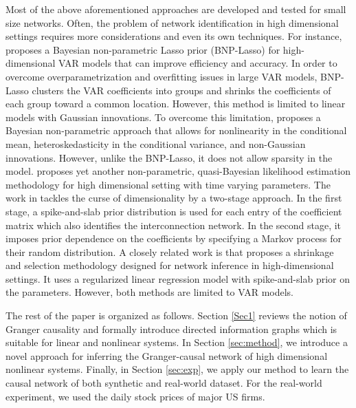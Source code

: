 Most of the above aforementioned approaches are developed and tested for small size networks. 
Often, the problem of network identification in high dimensional settings requires more considerations and even its own techniques. 
For instance, \citet{billio2019bayesian} proposes a Bayesian non-parametric Lasso prior (BNP-Lasso) for high-dimensional VAR models that can improve efficiency and accuracy. 
In order to overcome overparametrization and overfitting issues in large VAR models, BNP-Lasso clusters the VAR coefficients into groups and shrinks the coefficients of each group toward a common location.
However, this method is limited to linear models with Gaussian innovations.
To overcome this limitation, \citet{kalli2018bayesian} proposes a Bayesian non-parametric approach that allows for nonlinearity in the conditional mean, heteroskedasticity in the conditional variance, and non-Gaussian innovations. However, unlike the BNP-Lasso, it does not allow sparsity in the model.
\citet{petrova2019quasi} proposes yet another non-parametric, quasi-Bayesian likelihood estimation methodology for high dimensional setting with time varying parameters. 
The work in \citet{iacopini2019bayesian} tackles the curse of dimensionality by a two-stage approach. In the first stage, a spike-and-slab prior distribution is used for each entry of the coefficient matrix which also identifies the interconnection network.
In the second stage, it imposes prior dependence on the coefficients by specifying a Markov process for their random distribution. 
A closely related work is \citet{bernardi2019high} that proposes a shrinkage and selection methodology designed for network inference in high-dimensional settings. It uses a regularized linear regression model with spike-and-slab prior on the parameters.
However, both methods are limited to VAR models.



The rest of the paper is organized as follows. 
Section \ref{Sec1} reviews the notion of Granger causality and formally introduce directed information graphs which is suitable for linear and nonlinear systems. 
In Section \ref{sec:method}, we introduce a novel approach for inferring the Granger-causal network of high dimensional nonlinear systems. 
Finally, in Section \ref{sec:exp}, we apply our method to learn the causal network of both synthetic and real-world dataset. For the real-world experiment, we used the daily stock prices of major US firms.

